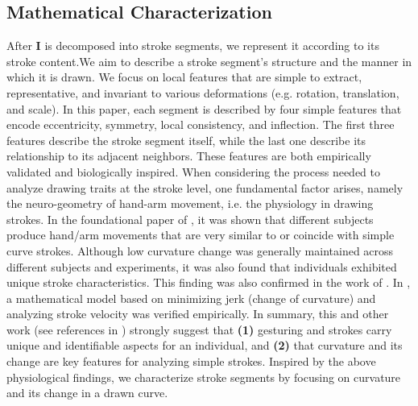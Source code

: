 
\vspace{-4mm}
\subsection{Mathematical Characterization} \label{subsec: featureExtraction}
\vspace{-1mm}
After $\mathbf{I}$ is decomposed into stroke segments, we represent it according to its stroke content.We aim to describe a stroke segment's structure and the manner in which it is drawn. We focus on local features that are simple to extract, representative, and invariant to various deformations (e.g. rotation, translation, and scale). In this paper, each segment is described by four simple features that encode eccentricity, symmetry, local consistency, and inflection. The first three features describe the stroke segment itself, while the last one describe its relationship to its adjacent neighbors. These features are both empirically validated and biologically inspired. When considering the process needed to analyze drawing traits at the stroke level, one fundamental factor arises, namely the neuro-geometry of hand-arm movement, i.e. the physiology in drawing strokes. In the foundational paper of  \cite{morasso1981spatial}, it was shown that different subjects produce hand/arm movements that are very similar to or coincide with simple curve strokes. Although low curvature change was generally maintained across different subjects and experiments, it was also found that individuals exhibited unique stroke characteristics. This finding was also confirmed in the work of  \cite{abend1982human}. In \cite{flash1985coordination}, a mathematical model based on minimizing jerk (change of curvature) and analyzing stroke velocity was verified empirically. In summary, this and other work (see references in \cite{flash1985coordination}) strongly suggest that \textbf{(1)} gesturing and strokes carry unique and identifiable aspects for an individual, and \textbf{(2)} that curvature and its change are key features for analyzing simple strokes. Inspired by the above physiological findings, we characterize stroke segments by focusing on curvature and its change in a drawn curve.

